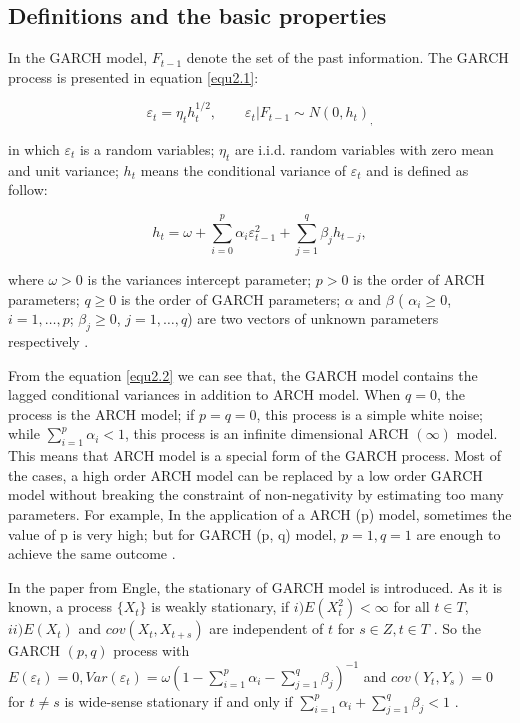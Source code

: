 \subsection{Definitions and the basic properties}
In the GARCH model, $F_{t-1}$ denote the set of the past information. The GARCH process is presented in equation \ref{equ2.1}:

\begin{equation} 
\label{equ2.1}
	\varepsilon_t =  \eta_t h_t^{1/2},    \qquad    \varepsilon_{t}|F_{t-1}\sim N(0,h_{t})_,
 \end{equation} 
 
in which $\varepsilon_t$ is a random variables; $\eta_t$ are i.i.d. random  variables with zero mean and unit variance; $h_{t}$ means the conditional variance of $\varepsilon_{t}$ and is defined as follow:

\begin{equation}
\label{equ2.2} 
h_t = \omega + \sum_{i=0}^p \alpha_i \varepsilon_{t-1}^2 + \sum_{j=1}^q\beta_j h_{t-j},
\end{equation} 

where $\omega>0$ is the variances intercept parameter; $p>0$ is the order of ARCH parameters; $q \geq 0$ is the order of GARCH parameters; $\alpha$ and $\beta$ ( $ \alpha_i \geq 0$, $i=1, \dots ,p$; $\beta_j \geq 0$, $j=1,\dots,q$) are two vectors of unknown parameters respectively \citep{Bollerslev1986}.

From the equation \ref{equ2.2} we can see that, the GARCH model contains the lagged conditional variances in addition to ARCH model. When  $q=0$, the process is the ARCH model; if $ p = q = 0$, this process is a simple white noise; while $\sum_{i=1}^p\alpha_i <1$, this process is an infinite dimensional ARCH  $(\infty)$ model. This means that ARCH model is a special form of the GARCH process. Most of the cases, a high order ARCH model can be replaced by a low order GARCH model without breaking the constraint of non-negativity by estimating too many parameters. For example, In the application of a ARCH (p) model, sometimes the value of p is very high; but for GARCH (p, q) model, $p=1, q=1$ are enough to achieve the same outcome \citep{Engle1986}.


In the paper from Engle, the stationary of GARCH model is introduced. As it is known, a process $\lbrace X_{t} \rbrace$  is weakly stationary,  if $i) E(X_{t}^{2}) < \infty$  for all  $t \in T$, $ ii) E(X_{t})$  and $cov(X_t,X_{t+s})$  are independent of $t$ for $s \in Z, t \in T$ \citep{Bougerol1992}. So the GARCH $(p,q)$ process with $E\left( \varepsilon_t \right) =0, Var(\varepsilon_t) = \omega(1-  \sum_{i=1}^p\alpha_i - \sum_{j=1}^q\beta_j )^{-1}$ and $cov(Y_t,Y_s)=0$ for $t \neq s$ is wide-sense stationary if and only if $\sum_{i=1}^p\alpha_i + \sum_{j=1}^q\beta_j < 1 $ \citep{Bollerslev1986}.

